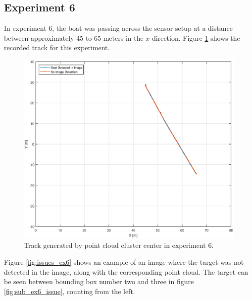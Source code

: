 \subsection{Experiment 6}
In experiment 6, the boat was passing across the sensor setup at a distance between approximately 45 to 65 meters in the $x$-direction. Figure \ref{fig:ex6_track} shows the recorded track for this experiment.  
\begin{figure}[H]
	\centering
	\includegraphics[width=.8\linewidth]{fig/exp_6_track.eps}
	\caption{Track generated by point cloud cluster center in experiment 6.}
	\label{fig:ex6_track}
\end{figure}
Figure \ref{fig:issues_ex6} shows an example of an image where the target was not detected in the image, along with the corresponding point cloud. The target can be seen between bounding box number two and three in figure \ref{fig:sub_ex6_issue}, counting from the left.
